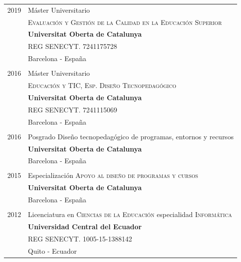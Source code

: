 \documentclass[a4paper]{article}
\begin{document}
\begin{longtable}{r|p{12cm}}
\textsc{2019} & Máster Universitario \\ & \textsc{Evaluación y Gestión de la Calidad en la Educación Superior}\\
& \textbf{Universitat Oberta de Catalunya}\\
& REG SENECYT. 7241175728\\
&Barcelona - España
\\\multicolumn{2}{c}{} \\

\textsc{2016} & Máster Universitario \\&  \textsc{Educación y TIC, Esp. Diseño Tecnopedagógico}\\
& \textbf{Universitat Oberta de Catalunya}\\
& REG SENECYT. 7241115069\\
&Barcelona - España\\

\multicolumn{2}{c}{} \\

\textsc{2016}  & Posgrado {Diseño tecnopedagógico de programas, entornos y recursos}\\
& \textbf{Universitat Oberta de Catalunya}\\
&Barcelona - España\\

\multicolumn{2}{c}{} \\

\textsc{2015} & Especialización \textsc{Apoyo al diseño de programas y cursos}\\
& \textbf{Universitat Oberta de Catalunya}\\
&Barcelona - España\\

\multicolumn{2}{c}{} \\

\textsc{2012} & Licenciatura en \textsc{Ciencias de la Educación} especialidad \textsc{Informática} \\&\textbf{Universidad Central del Ecuador} \\
& REG SENECYT. 1005-15-1388142\\
& Quito - Ecuador\\
\end{longtable}
\end{document}
